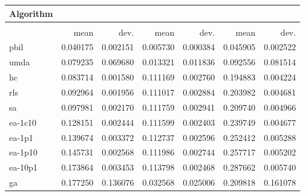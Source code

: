\begin{tabular}{@{} l *{6}{>{{}}N{1}{2}} @{}}
\toprule
{Algorithm} &  \\
\midrule
&  &  &  \\
\midrule
& {mean} & {dev.} & {mean} & {dev.} & {mean} & {dev.} \\
\midrule
pbil & 0.040175 & 0.002151 & 0.005730 & 0.000384 & 0.045905 & 0.002522 \\
umda & 0.079235 & 0.069680 & 0.013321 & 0.011836 & 0.092556 & 0.081514 \\
hc & 0.083714 & 0.001580 & 0.111169 & 0.002760 & 0.194883 & 0.004224 \\
rls & 0.092964 & 0.001956 & 0.111017 & 0.002884 & 0.203982 & 0.004681 \\
sa & 0.097981 & 0.002170 & 0.111759 & 0.002941 & 0.209740 & 0.004966 \\
ea-1c10 & 0.128151 & 0.002444 & 0.111599 & 0.002403 & 0.239749 & 0.004677 \\
ea-1p1 & 0.139674 & 0.003372 & 0.112737 & 0.002596 & 0.252412 & 0.005288 \\
ea-1p10 & 0.145731 & 0.002568 & 0.111986 & 0.002744 & 0.257717 & 0.005202 \\
ea-10p1 & 0.173864 & 0.003453 & 0.113798 & 0.002468 & 0.287662 & 0.005740 \\
ga & 0.177250 & 0.136076 & 0.032568 & 0.025006 & 0.209818 & 0.161078 \\
\bottomrule
\end{tabular}
